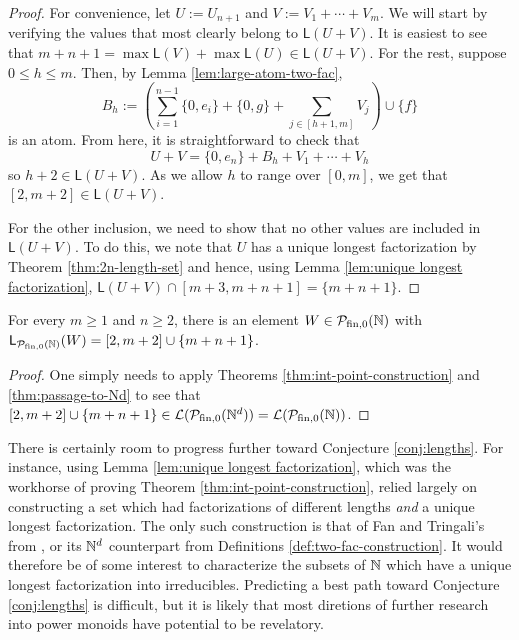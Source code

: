 \begin{proof}
	For convenience, let $U := U_{n+1}$ and $V := V_1 + \cdots + V_m$.
	We will start by verifying the values that most clearly belong to $\mathsf{L}(U+V)$.
	It is easiest to see that $m+n+1 =\max\mathsf{L}(V)+\max\mathsf{L}(U) \in \mathsf{L}(U+V)$.
	For the rest, suppose $0\le h \le m$.
	Then, by Lemma \ref{lem:large-atom-two-fac}, 
	\[B_h := \left( \sum_{i=1}^{n-1} \{0,e_i\} + \{0,g\} + \sum_{j\in [ h+1,m ]} V_j \right) \cup \{f\} \]
	is an atom.
	From here, it is straightforward to check that
	\[ U+ V = \{0,e_n\} + B_h + V_1 + \cdots + V_h \]
	so $h+2 \in \mathsf{L}(U+V)$.
	As we allow $h$ to range over $[ 0,m ]$, we get that $[ 2,m+2 ] \in \mathsf{L}(U+V)$.
	
	For the other inclusion, we need to show that no other values are included in $\mathsf{L}(U+V)$.
	To do this, we note that $U$ has a unique longest factorization by Theorem \ref{thm:2n-length-set} and hence, using Lemma \ref{lem:unique longest factorization}, $\mathsf{L}(U+V) \cap [ m+3, m+n+1 ] = \{m+n+1\}$.
\end{proof}

\begin{cor}
	For every $m\ge 1$ and $n\ge 2$, there is an element $W\in {\mathcal{P}_{\textrm{fin},0}(\mathbb{N})}$ with $\mathsf{L}_{\mathcal{P}_{\textrm{fin},0}(\mathbb{N})}(W) = [2,m+2]\cup\{m+n+1\}$.
\end{cor}

\begin{proof}
	One simply needs to apply Theorems \ref{thm:int-point-construction} and \ref{thm:passage-to-Nd} to see that $[2,m+2]\cup\{m+n+1\}\in \mathcal{L}(\mathcal{P}_{\textrm{fin}, 0}(\mathbb{N}^d)) = \mathcal{L}({\mathcal{P}_{\textrm{fin},0}(\mathbb{N})})$.
\end{proof}

There is certainly room to progress further toward Conjecture \ref{conj:lengths}.
For instance, using Lemma \ref{lem:unique longest factorization}, which was the workhorse of proving Theorem \ref{thm:int-point-construction}, relied largely on constructing a set which had factorizations of different lengths \textit{and} a unique longest factorization.
The only such construction is that of Fan and Tringali's from \cite[Proposition 4.10]{fan-tringali18}, or its $\mathbb{N}^d$ counterpart from Definitions \ref{def:two-fac-construction}.
It would therefore be of some interest to characterize the subsets of $\mathbb{N}$ which have a unique longest factorization into irreducibles.  
Predicting a best path toward Conjecture \ref{conj:lengths} is difficult, but it is likely that most diretions of further research into power monoids have potential to be revelatory. 
